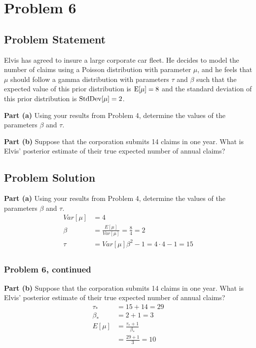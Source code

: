 \documentclass[12pt]{article}
\theoremstyle{definition}
\begin{document}
\newpage
\section*{Problem 6}

\subsection*{Problem Statement}

Elvis has agreed to insure a large corporate car fleet. He decides to model the number of claims using a Poisson distribution with parameter $\mu$, and he feels that $\mu$ should follow a gamma distribution with parameters $\tau$ and $\beta$ such that the expected value of this prior distribution is $\hbox{E}[\mu] = 8$ and the standard deviation of this prior distribution is $\hbox{StdDev}[\mu] = 2$.

\bigskip
\noindent
{\bf Part (a)} Using your results from Problem 4, determine the values of the parameters $\beta$ and $\tau$.

\bigskip
\noindent
{\bf Part (b)} Suppose that the corporation submits 14 claims in one year. What is Elvis' posterior estimate of their true expected number of annual claims?


\subsection*{Problem Solution}

\noindent
{\bf Part (a)} Using your results from Problem 4, determine the values of the parameters $\beta$ and $\tau$.
\begin{align*}
Var[\mu] &= 4\\
\beta &= \frac{E[\mu]}{Var[\mu]} = \frac{8}{4} = 2\\
\tau &= Var[\mu]\beta^2 - 1 = 4 \cdot 4 - 1 = 15\\
\end{align*}
\newpage
\subsubsection*{Problem 6, continued}

\noindent
{\bf Part (b)} Suppose that the corporation submits 14 claims in one year. What is Elvis' posterior estimate of their true expected number of annual claims?
\begin{align*}
\tau_* &= 15 + 14 = 29\\
\beta_* &= 2 + 1 = 3\\
E[\mu] &= \frac{\tau_* + 1}{\beta_*}\\
&= \frac{29 + 1}{3} = 10
\end{align*}
\end{document}
